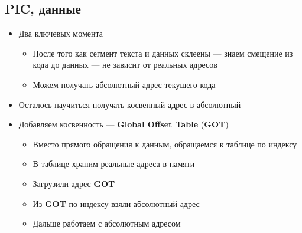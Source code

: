 \documentclass[../../lectures.tex]{subfiles}
\begin{document}
\subsection{PIC, данные}
\begin{itemize}
    \item Два ключевых момента
        \begin{itemize}
            \item После того как сегмент текста и данных склеены --- знаем смещение из кода до данных --- не зависит от реальных адресов
            \item Можем получать абсолютный адрес текущего кода
        \end{itemize}
    \item Осталось научиться получать косвенный адрес в абсолютный
    \item Добавляем косвенность --- \textbf{Global Offset Table} (\textbf{GOT})
        \begin{itemize}
            \item Вместо прямого обращения к данным, обращаемся к таблице по индексу
            \item В таблице храним реальные адреса в памяти
            \item Загрузили адрес \textbf{GOT}
            \item Из \textbf{GOT} по индексу взяли абсолютный адрес
            \item Дальше работаем с абсолютным адресом
        \end{itemize}
\end{itemize}
\end{document}
